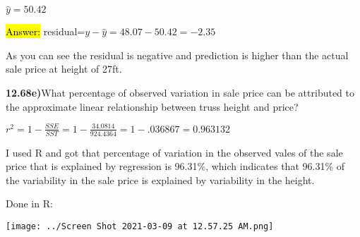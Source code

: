 \documentclass{article}
\begin{document}
\vspace{2mm}

$\hat{y}=50.42$



\hl{Answer:} residual=$y-\hat{y}=48.07-50.42=-2.35$

\vspace{2mm}

As you can see the residual is negative and prediction is higher than the actual sale price at height of 27ft. %





\vspace{5mm}

\textbf{12.68e)}What percentage of observed variation in sale price can be attributed to the approximate linear relationship between truss height and price?

\vspace{2mm}

$r^{2}=1-\frac{SSE}{SST}=1-\frac{34.0814}{924.4364}=1-.036867=0.963132$



I used R and got that percentage of variation in the observed vales of the sale price that is explained by regression is 96.31\%, which indicates that 96.31\% of the variability in the sale price is explained by variability in the height.  

\vspace{2mm}

\newpage
Done in R:

\vspace{2mm}

\texttt{[image: ../Screen Shot 2021-03-09 at 12.57.25 AM.png]}
\end{document}
